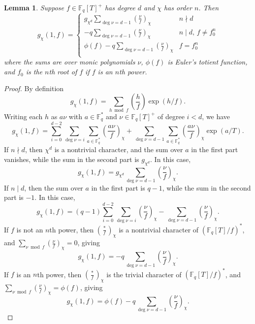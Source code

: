 \documentclass[11pt,letterpaper]{article}
\newtheorem{lemma}[theorem]{Lemma}
\theoremstyle{definition}
\theoremstyle{remark}
\numberwithin{equation}{section}
\theoremstyle{dotless}
\newcommand{\F}{\mathbb{F}}
\newcommand{\res}[2]{\left(\frac{#1}{#2}\right)}
\begin{document}
\begin{lemma}\label{GaussSumEval}
Suppose $f\in \F_q[T]^+$ has degree $d$ and $\chi$ has order $n$. Then
\begin{equation}
g_{\chi}(1, f) = \left\lbrace \begin{array}{cc} g_{\chi^d} \sum\limits_{\deg \nu = d-1} \res{\nu}{f}_{\chi} & n \nmid d  \\ 
-q \sum\limits_{\deg \nu = d-1} \res{\nu}{f}_{\chi} & n\mid d, \, f \neq f_0^n \\  
\phi(f) -q \sum\limits_{\deg \nu = d-1} \res{\nu}{f}_{\chi} & f = f_0^n \\  
\end{array} \right.
\end{equation}
where the sums are over monic polynomials $\nu$, $\phi(f)$ is Euler's totient function, and $f_0$ is the $n$th root of $f$ if $f$ is an $n$th power. 
\end{lemma}
\begin{proof}
By definition
\begin{equation*}
g_{\chi}(1, f) = \sum_{h \bmod f} \res{h}{f} \exp(h/f).
\end{equation*}
Writing each $h$ as  $a \nu$ with $a\in\F_q^*$ and $\nu \in \F_q[T]^+$ of degree $i<d$, we have
\begin{equation*}
g_{\chi}(1, f) = \sum_{i=0}^{d -2} \sum_{\deg \nu=i} \sum_{a \in \F_q^*} \res{a \nu}{f}_{\chi} +\sum_{\deg \nu=d -1} \sum_{a \in \F_q^*} \res{a \nu}{f}_{\chi} \exp(a/T).
\end{equation*}
If $n \nmid d$, then $\chi^d$ is a nontrivial character, and the sum over $a$ in the first part vanishes, while the sum in the second part is $g_{\chi^d}$. In this case,
\begin{equation*} 
g_{\chi}(1, f) = g_{\chi^d} \sum_{\deg \nu=d -1} \res{\nu}{f}_{\chi}.
\end{equation*}
If $n \mid d$, then the sum over $a$ in the first part is $q-1$, while the sum in the second part is $-1$. In this case,
\begin{equation*}
g_{\chi}(1, f) = (q-1)\sum_{i=0}^{d -2} \sum_{\deg \nu=i} \res{\nu}{f}_{\chi} -\sum_{\deg \nu=d -1} \res{\nu}{f}_{\chi}.
\end{equation*}
If $f$ is not an $n$th power, then $\res{*}{f}_{\chi}$ is a nontrivial character of $(\F_q[T]/f)^*$, and $\sum\limits_{\nu \bmod f} \res{\nu}{f}_{\chi} = 0$, giving 
\begin{equation*}
g_{\chi}(1, f) = -q \sum_{\deg \nu=d -1} \res{\nu}{f}_{\chi}.
\end{equation*} 
If $f$ is an $n$th power, then $\res{*}{f}_{\chi}$ is the trivial character of $(\F_q[T]/f)^*$, and $\sum\limits_{\nu\bmod f} \res{\nu}{f}_{\chi} = \phi(f)$, giving 
\begin{equation*}
g_{\chi}(1, f) = \phi(f) -q \sum_{\deg \nu=d -1} \res{\nu}{f}_{\chi}.
\end{equation*} 
\end{proof}
\end{document}
